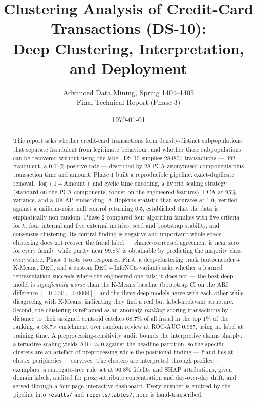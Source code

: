 \documentclass[11pt, a4paper]{article}
\title{\textbf{Clustering Analysis of Credit-Card Transactions (DS-10):\\
Deep Clustering, Interpretation, and Deployment}}
\author{Advanced Data Mining, Spring 1404--1405 \\ Final Technical Report (Phase 3)}
\date{\today}
\providecommand{\num}[1]{#1}
\begin{document}
\maketitle

\begin{abstract}
\noindent
This report asks whether credit-card transactions form density-distinct
subpopulations that separate fraudulent from legitimate behaviour, and whether
those subpopulations can be recovered without using the label. DS-10 supplies
\num{284807} transactions --- \num{492} fraudulent, a \num{0.17}\% positive rate
--- described by 28 PCA-anonymised components plus transaction time and amount.
Phase 1 built a reproducible pipeline: exact-duplicate removal,
$\log(1+\text{Amount})$ and cyclic time encoding, a hybrid scaling strategy
(standard on the PCA components, robust on the engineered features), PCA at
95\% variance, and a UMAP embedding. A Hopkins statistic that saturates at
\num{1.0}, verified against a uniform-noise null control returning \num{0.5},
established that the data is emphatically non-random. Phase 2 compared four
algorithm families with five criteria for $k$, four internal and five external
metrics, seed and bootstrap stability, and consensus clustering. Its central
finding is negative and important: whole-space clustering does not recover the
fraud label --- chance-corrected agreement is near zero for every family, while
purity near \num{99.8}\% is obtainable by predicting the majority class
everywhere. Phase 3 tests two responses. First, a deep-clustering track
(autoencoder\,+\,K-Means, DEC, and a custom DEC\,+\,InfoNCE variant) asks whether
a learned representation succeeds where the engineered one fails; it does not ---
the best deep model is \emph{significantly worse} than the K-Means baseline
(bootstrap CI on the ARI difference $[-0.0091, -0.0004]$), and the three deep
models agree with each other while disagreeing with K-Means, indicating they find
a real but label-irrelevant structure. Second, the clustering is reframed as an
anomaly \emph{ranking}: scoring transactions by distance to their assigned
centroid catches \num{68.7}\% of all fraud in the top 1\% of the ranking, a
\num{68.7}$\times$ enrichment over random review at ROC-AUC \num{0.967}, using no
label at training time. A preprocessing-sensitivity audit bounds the interpretive
claims sharply: alternative scaling yields ARI $\approx 0$ against the headline
partition, so the specific clusters are an artefact of preprocessing while the
positional finding --- fraud lies at cluster peripheries --- survives. The
clusters are interpreted through profiles, exemplars, a surrogate-tree rule set
at \num{96.8}\% fidelity and SHAP attributions, given domain labels, audited for
proxy-attribute concentration and day-over-day drift, and served through a
four-page interactive dashboard. Every number is emitted by the pipeline into
\texttt{results/} and \texttt{reports/tables/}; none is hand-transcribed.
\end{abstract}
\end{document}
